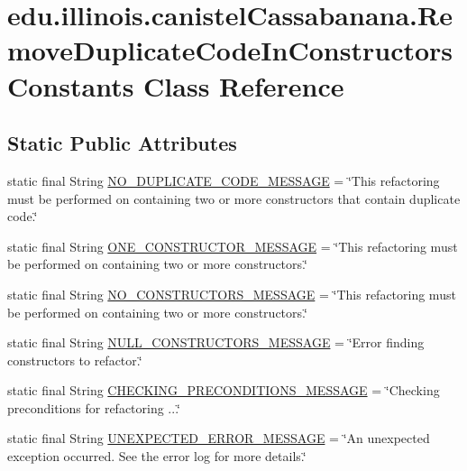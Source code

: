 \hypertarget{classedu_1_1illinois_1_1canistelCassabanana_1_1RemoveDuplicateCodeInConstructorsConstants}{
\section{edu.illinois.canistelCassabanana.RemoveDuplicateCodeInConstructorsConstants Class Reference}
\label{classedu_1_1illinois_1_1canistelCassabanana_1_1RemoveDuplicateCodeInConstructorsConstants}
}
\subsection*{Static Public Attributes}
\begin{DoxyCompactItemize}
\item 
static final String \hyperlink{classedu_1_1illinois_1_1canistelCassabanana_1_1RemoveDuplicateCodeInConstructorsConstants_a690b7d9efb6cfe6f9bb3b0cfbc9ba58f}{NO\_\-DUPLICATE\_\-CODE\_\-MESSAGE} = \char`\"{}This refactoring must be performed on containing two or more constructors that contain duplicate code.\char`\"{}
\item 
static final String \hyperlink{classedu_1_1illinois_1_1canistelCassabanana_1_1RemoveDuplicateCodeInConstructorsConstants_ad01fc3d835596cfcb50ebbf54a9c133e}{ONE\_\-CONSTRUCTOR\_\-MESSAGE} = \char`\"{}This refactoring must be performed on containing two or more constructors.\char`\"{}
\item 
static final String \hyperlink{classedu_1_1illinois_1_1canistelCassabanana_1_1RemoveDuplicateCodeInConstructorsConstants_a76b9ae1d61eebfbffcef6b6a07e99fa3}{NO\_\-CONSTRUCTORS\_\-MESSAGE} = \char`\"{}This refactoring must be performed on containing two or more constructors.\char`\"{}
\item 
static final String \hyperlink{classedu_1_1illinois_1_1canistelCassabanana_1_1RemoveDuplicateCodeInConstructorsConstants_a2e0637b8a100de734054aff8b12c62b7}{NULL\_\-CONSTRUCTORS\_\-MESSAGE} = \char`\"{}Error finding constructors to refactor.\char`\"{}
\item 
static final String \hyperlink{classedu_1_1illinois_1_1canistelCassabanana_1_1RemoveDuplicateCodeInConstructorsConstants_af08e2ca4fcb3b7e1dd047b88a278d125}{CHECKING\_\-PRECONDITIONS\_\-MESSAGE} = \char`\"{}Checking preconditions for refactoring ...\char`\"{}
\item 
static final String \hyperlink{classedu_1_1illinois_1_1canistelCassabanana_1_1RemoveDuplicateCodeInConstructorsConstants_a7a26202b57ca9d8cec6eff644aa32b0e}{UNEXPECTED\_\-ERROR\_\-MESSAGE} = \char`\"{}An unexpected exception occurred. See the error log for more details.\char`\"{}

\end{DoxyCompactItemize}
